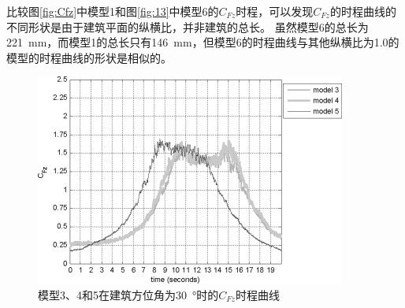 \documentclass{ctexart}
\begin{document}
比较图\ref{fig:Cfz}中模型1和图\ref{fig:13}中模型6的$C_{Fz}$时程，可以发现$C_{Fz}$的时程曲线的不同形状是由于建筑平面的纵横比，并非建筑的总长。
虽然模型6的总长为\SI{221}{mm}，而模型1的总长只有\SI{146}{mm}，但模型6的时程曲线与其他纵横比为\num{1.0}的模型的时程曲线的形状是相似的。
\begin{figure}
\centering
\includegraphics[width=0.7\linewidth]{./fig/9.jpg}
\caption{模型3、4和5在建筑方位角为\SI{30}{\degree}时的$C_{Fz}$时程曲线}
\label{fig:9}
\end{figure}


\printbibliography
\end{document}
